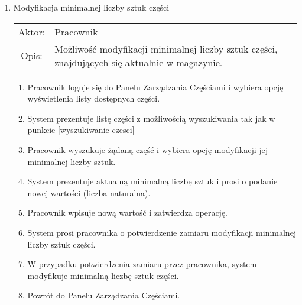 \begin{enumerate}
  \item Modyfikacja minimalnej liczby sztuk części \\
  \begin{tabularx}{\linewidth}{ c X }
  Aktor: & Pracownik \\
  Opis: & Możliwość modyfikacji minimalnej liczby sztuk części, znajdujących się aktualnie w magazynie.\\
  \end{tabularx}
   \begin{enumerate}
    \item Pracownik loguje się do Panelu Zarządzania Częściami i wybiera opcję wyświetlenia listy dostępnych części.
    \item System prezentuje listę części z możliwością wyszukiwania tak jak w punkcie \ref{wyszukiwanie-czesci}
    \item Pracownik wyszukuje żądaną część i wybiera opcję modyfikacji jej minimalnej liczby sztuk.
    \item System prezentuje aktualną minimalną liczbę sztuk i prosi o podanie nowej wartości (liczba naturalna).
    \item Pracownik wpisuje nową wartość i zatwierdza operację.
    \item System prosi pracownika o potwierdzenie zamiaru modyfikacji minimalnej liczby sztuk części.
    \item W przypadku potwierdzenia zamiaru przez pracownika, system modyfikuje minimalną liczbę sztuk części.
    \item Powrót do Panelu Zarządzania Częściami.
  \end{enumerate}
  

\end{enumerate}
